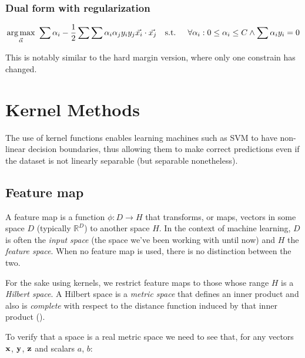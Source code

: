 \subsubsection*{Dual form with regularization}
\begin{align}\label{eq:svm_dual_reg} 
    \underset{\vec{\alpha}}{\text{arg} \max}\ \sum \alpha_i - \frac{1}{2} \sum \sum \alpha_i \alpha_j y_i y_j \vec{x_i} \cdot \vec{x_j}
    \text{\quad s.t. \quad} \forall \alpha_i : 0 \le \alpha_i \le C \land \sum \alpha_i y_i = 0
\end{align}

This is notably similar to the hard margin version, where only one constrain has changed. 

\pagebreak

\section{Kernel Methods}
\label{sec:ch4.kernels}

The use of kernel functions enables learning machines such as SVM to have non-linear decision boundaries, thus allowing them to make correct predictions even if the dataset is not linearly separable (but separable nonetheless).

\subsection{Feature map}

A feature map is a function $\phi : D \rightarrow H$ that transforms, or maps, vectors in some space $D$ (typically $\mathbb{R}^D$) to another space $H$. In the context of machine learning, $D$ is often the \emph{input space} (the space we've been working with until now) and $H$ the \emph{feature space}. When no feature map is used, there is no distinction between the two.

For the sake using kernels, we restrict feature maps to those whose range $H$ is a \emph{Hilbert space}. A Hilbert space is a \emph{metric space} that defines an inner product and also is \emph{complete} with respect to the distance function induced by that inner product (\cite{noauthor_wikipedia_2021-1}).

To verify that a space is a real metric space we need to see that, for any vectors $\mathbf{x}$, $\mathbf{y}$, $\mathbf{z}$ and scalars $a$, $b$:


